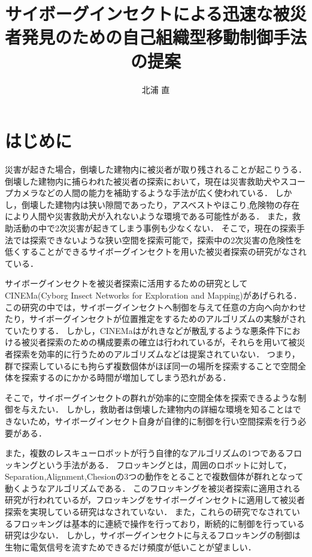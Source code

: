 \documentclass[a4paper,11pt]{jarticle}
\title{サイボーグインセクトによる迅速な被災者発見のための自己組織型移動制御手法の提案}
\author{北浦 直}
\begin{document}
	\titlepage    %
	\abstract     %
	\keyword
	\tableofcontents    %
	\section{はじめに}
	災害が起きた場合，倒壊した建物内に被災者が取り残されることが起こりうる．
	倒壊した建物内に捕らわれた被災者の探索において，現在は災害救助犬やスコープカメラなどの人間の能力を補助するような手法が広く使われている\cite{USR}．
	しかし，倒壊した建物内は狭い隙間であったり，アスベストやほこり,危険物の存在により人間や災害救助犬が入れないような環境である可能性がある\cite{environment}．
	また，救助活動の中で2次災害が起きてしまう事例も少なくない．
	そこで，現在の探索手法では探索できないような狭い空間を探索可能で，探索中の2次災害の危険性を低くすることができるサイボーグインセクトを用いた被災者探索の研究がなされている\cite{CyborgInsect}．

	サイボーグインセクトを被災者探索に活用するための研究としてCINEMa(Cyborg Insect Networks for Exploration and Mapping)があげられる\cite{CINEMa}．
	この研究の中では，サイボーグインセクトへ制御を与えて任意の方向へ向かわせたり，サイボーグインセクトが位置推定をするためのアルゴリズムの実験がされていたりする．
	しかし，CINEMaはがれきなどが散乱するような悪条件下における被災者探索のための構成要素の確立は行われているが，それらを用いて被災者探索を効率的に行うためのアルゴリズムなどは提案されていない．
	つまり，群で探索しているにも拘らず複数個体がほぼ同一の場所を探索することで空間全体を探索するのにかかる時間が増加してしまう恐れがある．
	
	そこで，サイボーグインセクトの群れが効率的に空間全体を探索できるような制御を与えたい．
	しかし，救助者は倒壊した建物内の詳細な環境を知ることはできないため，サイボーグインセクト自身が自律的に制御を行い空間探索を行う必要がある．
		
	また，複数のレスキューロボットが行う自律的なアルゴリズムの1つであるフロッキングという手法がある．
	フロッキングとは，周囲のロボットに対して，Separation,Alignment,Chesionの3つの動作をとることで複数個体が群れとなって動くようなアルゴリズムである．
	このフロッキングを被災者探索に適用される研究が行われているが，フロッキングをサイボーグインセクトに適用して被災者探索を実現している研究はなされていない．
	また，これらの研究でなされているフロッキングは基本的に連続で操作を行っており，断続的に制御を行っている研究は少ない．
	しかし，サイボーグインセクトに与えるフロッキングの制御は生物に電気信号を流すためできるだけ頻度が低いことが望ましい．
	
\end{document}
